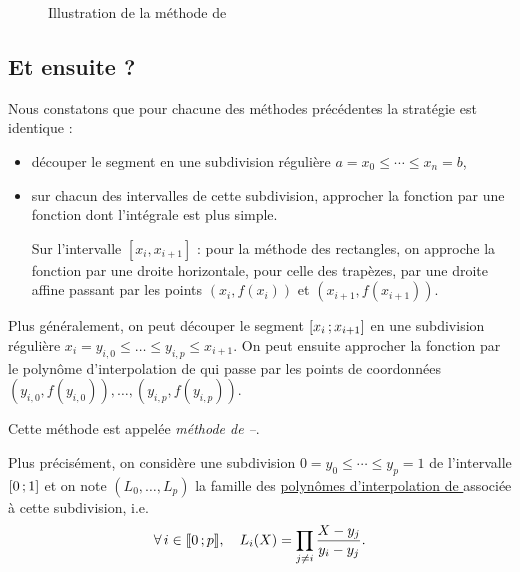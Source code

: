 \begin{figure}[H]
    \centering
    
    \caption{Illustration de la méthode de }
\end{figure}


\subsection{Et ensuite ?}

Nous constatons que pour chacune des méthodes précédentes la stratégie est identique :
\begin{itemize}
\item découper le segment en une subdivision régulière $a = x_0 \leqslant \cdots \leqslant x_n = b$,

\item sur chacun des intervalles de cette subdivision, approcher la fonction par une fonction dont l'intégrale est plus simple.

Sur l'intervalle $[x_i, x_{i+1}]$ : pour la méthode des rectangles, on approche la fonction par une droite horizontale, pour celle des trapèzes, par une droite affine passant par les points $(x_i, f(x_i))$ et $(x_{i+1}, f(x_{i+1}))$.
\end{itemize}

Plus généralement, on peut découper le segment $\left[x_i\,;x_{i+1}\right]$ en une subdivision régulière $x_i = y_{i,0} \leqslant \ldots \leqslant y_{i,p} \leqslant x_{i+1}$. On peut ensuite approcher la fonction par le polynôme d'interpolation de  qui passe par les points de coordonnées $(y_{i,0}, f(y_{i,0})), \ldots, (y_{i,p}, f(y_{i,p}))$.

Cette méthode est appelée \emph{méthode de --}.

Plus précisément, on considère une subdivision $0 = y_0 \leqslant \cdots \leqslant y_p = 1$ de l'intervalle $\left[0\,;1\right]$ et on note $(L_0,\ldots,L_p)$ la famille des \hyperref[sec:polynomes_de_lagrange]{polynômes d'interpolation de } associée à cette subdivision, i.e.
\[
\forall i \in \interent{0}{p},\quad L_i(X) = \prod_{j \neq i} \frac{X - y_j}{y_i - y_j}.
\]

